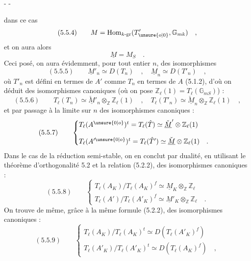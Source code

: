 \begin{center}-  -\end{center}

dans ce cas
\[
(5.5.4)\qquad M=\operatorname{Hom}_{k\text{-gr}}(T'_{\unsure{o|0}},\mathbb G_{mk})\quad,
\]
et on aura alors
\[
\underline M=M_S\quad.
\]
Ceci posé, on aura évidemment, pour tout entier $n$, des isomorphismes
\[
(5.5.5)\qquad\underline M'_n\simeq D(T_n)\quad,\quad\underline M_n\simeq D(T'_n)\quad,
\]
où $T'_n$ est défini en termes de $A'$ comme $T_n$ en termes de $A$ (5.1.2), d'où on déduit des isomorphismes canoniques (où on pose $\mathbb Z_\ell(1)=T_\ell(\mathbb G_{mS})$) :
\[
(5.5.6)\qquad T_\ell(T_n)\simeq\check{\underline M}'_n\otimes_{\mathbb Z}\mathbb Z_\ell(1)\quad,\quad T_\ell(T'_n)\simeq\check{\underline M}_n\otimes_{\mathbb Z}\mathbb Z_\ell(1)\quad,
\]
et par passage à la limite sur $n$ des isomorphismes canoniques :
\[
(5.5.7)\qquad\begin{cases}
T_\ell(A^{\unsure{0|o}})^t=T_\ell(\hat T)\simeq\check{\underline M}'\otimes\mathbb Z_\ell(1)\\[1em]
T_\ell(A'^{\unsure{0|o}})^t=T_\ell(\hat T')\simeq\check{\underline M}\otimes\mathbb Z_\ell(1)\quad.
\end{cases}
\]
Dans le cas de la réduction semi-stable, on en conclut par dualité, en utilisant le théorème d'orthogonalité 5.2 et la relation (5.2.2), des isomorphismes canoniques :
\[
(5.5.8)\qquad\begin{cases}
T_\ell(A_K)/T_\ell(A_K)^f\simeq\underline M_K\otimes_{\mathbb Z}\mathbb Z_\ell\\[1em]
T_\ell(A')/T_\ell(A'_K)^f\simeq\underline M'_K\otimes_{\mathbb Z}\mathbb Z_\ell\quad.
\end{cases}
\]
On trouve de même, grâce à la même formule (5.2.2), des isomorphismes canoniques :
\[
(5.5.9)\qquad\begin{cases}
T_\ell(A_K)/T_\ell(A_K)^t\simeq D(T_\ell(A'_K)^f)\\[1em]
T_\ell(A'_K)/T_\ell(A'_K)^t\simeq D(T_\ell(A_K)^f)\quad,
\end{cases}
\]
